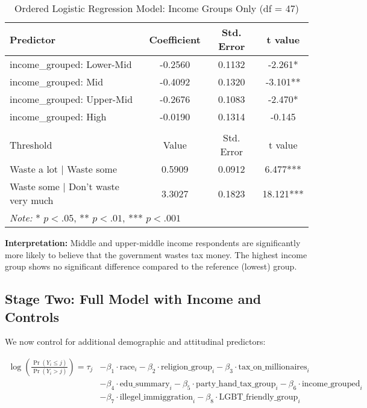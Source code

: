 \documentclass{article}
\begin{document}
\begin{table}[H]
    \centering
    \caption{Ordered Logistic Regression Model: Income Groups Only (df = 47)}
    \begin{tabular}{lccc}
    \hline
    \textbf{Predictor} & \textbf{Coefficient} & \textbf{Std. Error} & \textbf{t value} \\
    \hline
    income\_grouped: Lower-Mid & -0.2560 & 0.1132 & -2.261* \\
    income\_grouped: Mid & -0.4092 & 0.1320 & -3.101** \\
    income\_grouped: Upper-Mid & -0.2676 & 0.1083 & -2.470* \\
    income\_grouped: High & -0.0190 & 0.1314 & -0.145 \\
    \hline
    \addlinespace[0.5em]
    \multicolumn{4}{l}{\textbf{Intercepts}} \\
    \hline
    Threshold & Value & Std. Error & t value \\
    \hline
    Waste a lot $|$ Waste some & 0.5909 & 0.0912 & 6.477*** \\
    Waste some $|$ Don’t waste very much & 3.3027 & 0.1823 & 18.121*** \\
    \hline
    \multicolumn{4}{l}{\textit{Note:} * $p < .05$, ** $p < .01$, *** $p < .001$} \\
    \end{tabular}
\end{table}

    

\noindent
\textbf{Interpretation:} Middle and upper-middle income respondents are significantly more likely to believe that the government wastes tax money. The highest income group shows no significant difference compared to the reference (lowest) group.

\subsection{Stage Two: Full Model with Income and Controls}

We now control for additional demographic and attitudinal predictors:

\[
\begin{aligned}
\log \left( \frac{\Pr(Y_i \leq j)}{\Pr(Y_i > j)} \right) = \tau_j &- \beta_1 \cdot \text{race}_i 
- \beta_2 \cdot \text{religion\_group}_i 
- \beta_3 \cdot \text{tax\_on\_millionaires}_i \\
&- \beta_4 \cdot \text{edu\_summary}_i 
- \beta_5 \cdot \text{party\_hand\_tax\_group}_i 
- \beta_6 \cdot \text{income\_grouped}_i \\
&- \beta_7 \cdot \text{illegel\_immiggration}_i 
- \beta_8 \cdot \text{LGBT\_friendly\_group}_i
\end{aligned}
\]
\end{document}
